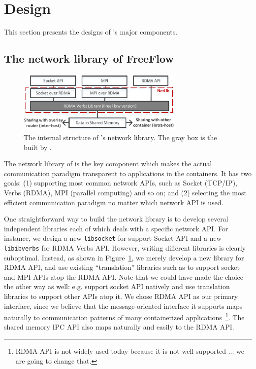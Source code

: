 \section{Design} \label{sec:design}

This section presents the designs of \sysname's major components. 

\subsection{The network library of FreeFlow}
\label{subsec:netlib}

\begin{figure}[t!] 
     \centering 
     \includegraphics[width=3.2in]{figures/netlib.pdf} 
    \caption{\label{fig:netlib} The internal structure of \sysname's network library. The gray box is the built by \sysname.} 
\end{figure} 

The network library of \sysname is the key component which makes the actual
communication paradigm transparent to applications in the containers.  It has
two goals: (1) supporting most common network APIs, such as Socket (TCP/IP),
Verbs (RDMA), MPI (parallel computing) and so on; and (2) selecting the most
efficient communication paradigm no matter which network API is used. 

One straightforward way to build the network library is to develop several
independent libraries each of which deals with a specific network API.  For
instance, we design a new \texttt{libsocket} for support Socket API and a new
\texttt{libibverbs} for RDMA Verbs API. However, writing different libraries is
clearly suboptimal. Instead, as shown in  Figure~\ref{fig:netlib}, we merely
develop a new library for RDMA API, and use existing ``translation'' libraries
such as \cite{rsockets,sdp,rfc7609,mpi-rdma} to support socket and MPI APIs
atop the RDMA API. Note that we could have made the choice the other way as
well: e.g. support socket API natively and use translation libraries to support
other APIs atop it. We chose RDMA API as our primary interface, since we believe
that the message-oriented interface it supports maps naturally to communication
patterns of many containerized applications~\footnote{RDMA API is not widely
used today because it is not well supported ... we are going to change that.}.
The shared memory IPC API also maps naturally and easily to the RDMA API.

